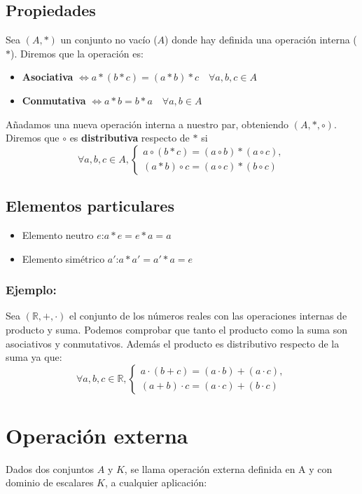 \subsection*{Propiedades}
Sea $(A,*)$ un conjunto no vacío ($A$) donde hay definida una operación interna ($*$). Diremos que la operación es:

\begin{itemize}
\item \textbf{Asociativa} $\Leftrightarrow a*(b*c)=(a*b)*c \quad \forall a,b,c \in A$
\item \textbf{Conmutativa} $\Leftrightarrow a*b=b*a \quad \forall a,b \in A$
\end{itemize}

Añadamos una nueva operación interna a nuestro par, obteniendo $(A,*,\circ)$. Diremos que $\circ$ es \textbf{distributiva} respecto de $*$ si
$$
\forall a,b,c \in A, 
\begin{cases}
a\circ (b*c)=(a\circ b)*(a\circ c),\\
(a*b)\circ c= (a \circ c) * (b \circ c)
\end{cases}
$$

\subsection*{Elementos particulares}
\begin{itemize}
\item Elemento neutro $e$:\quad $a*e=e*a=a$
\item Elemento simétrico $a'$:\quad $a*a'=a'*a=e$
\end{itemize}

\subsubsection*{Ejemplo:}
Sea $(\mathbb{R},+,\cdot )$ el conjunto de los números reales con las operaciones internas de producto y suma. Podemos comprobar que tanto el producto como la suma son asociativos y conmutativos. Además el producto es distributivo respecto de la suma ya que:
$$
\forall a,b,c \in \mathbb{R}, 
\begin{cases}
a\cdot (b+c)=(a\cdot b)+(a \cdot c),\\
(a+b)\cdot c= (a \cdot c) + (b \cdot c)
\end{cases}
$$


\section{Operación externa}
Dados dos conjuntos $A$ y $K$, se llama operación externa definida en A y con dominio de escalares $K$, a cualquier aplicación:\\

